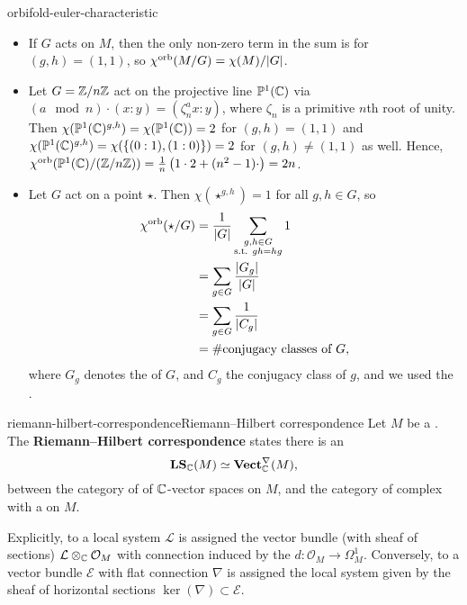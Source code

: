 \begin{example}{orbifold-euler-characteristic}
    \begin{itemize}
        \item If $G$ acts  on $M$, then the only non-zero term in the sum is for $(g, h) = (1, 1)$, so $\chi^\textup{orb}(M/G) = \chi(M) / |G|$.
        \item Let $G = \mathbb{Z}/n\mathbb{Z}$ act on the projective line $\mathbb{P}^1(\mathbb{C})$ via $(a \mod n) \cdot (x : y) = (\zeta_n^a x : y)$, where $\zeta_n$ is a primitive $n$th root of unity. Then $\chi(\mathbb{P}^1(\mathbb{C})^{g, h}) = \chi(\mathbb{P}^1(\mathbb{C})) = 2$ for $(g, h) = (1, 1)$ and $\chi(\mathbb{P}^1(\mathbb{C})^{g, h}) = \chi(\{ (0 : 1), (1 : 0) \}) = 2$ for $(g, h) \ne (1, 1)$ as well. Hence, $\chi^\textup{orb}(\mathbb{P}^1(\mathbb{C}) / (\mathbb{Z}/n\mathbb{Z})) = \frac{1}{n} \left(1 \cdot 2 + (n^2 - 1) \cdot \right) = 2n$.
        \item Let $G$ act on a point $\star$. Then $\chi(\star^{g, h}) = 1$ for all $g, h \in G$, so
        \[ \begin{aligned}
            \chi^\textup{orb}(\star / G)
                &= \frac{1}{|G|} \sum_{\substack{g, h \in G \\ \textup{s.t. } gh = hg}} 1 \\
                &= \sum_{g \in G} \frac{|G_g|}{|G|} \\
                &= \sum_{g \in G} \frac{1}{|C_g|} \\
                &= \# \textup{conjugacy classes of $G$} ,
        \end{aligned} \]
        where $G_g$ denotes the  of $G$, and $C_g$ the conjugacy class of $g$, and we used the .
    \end{itemize}
\end{example}

\begin{topic}{riemann-hilbert-correspondence}{Riemann--Hilbert correspondence}
    Let $M$ be a . The \textbf{Riemann--Hilbert correspondence} states there is an 
    \[ \textbf{LS}_{\mathbb{C}}(M) \simeq \textbf{Vect}_{\mathbb{C}}^\nabla(M) , \]
    between the category of  of $\mathbb{C}$-vector spaces on $M$, and the category of complex  with a   on $M$.
    
    Explicitly, to a local system $\mathcal{L}$ is assigned the vector bundle (with sheaf of sections) $\mathcal{L} \otimes_{\mathbb{C}} \mathcal{O}_M$ with connection induced by the  $d \colon \mathcal{O}_M \to \Omega_M^1$. Conversely, to a vector bundle $\mathcal{E}$ with flat connection $\nabla$ is assigned the local system given by the sheaf of horizontal sections $\ker(\nabla) \subset \mathcal{E}$.
\end{topic}

